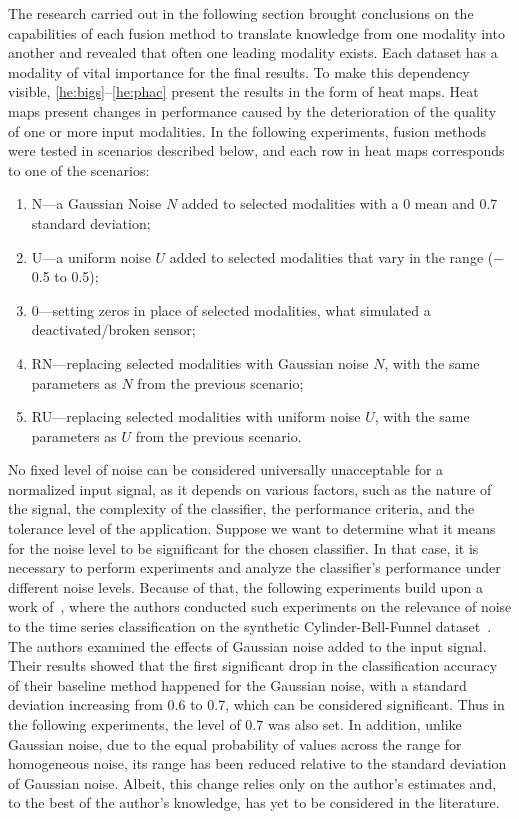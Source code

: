 \documentclass[a4paper, 10pt, twoside]{report}
\begin{document}
The research carried out in the following section brought conclusions on the capabilities of each fusion method to translate knowledge from one modality into another and revealed that often one leading modality exists. Each dataset has a modality of vital importance for the final results. To make this dependency visible, \Figure\ref{he:bigs}--\ref{he:phac} present the results in the form of heat maps. Heat maps present changes in performance caused by the deterioration of the quality of one or more input modalities. In the following experiments, fusion methods were tested in scenarios described below, and each row in heat maps corresponds to one of the scenarios:

\begin{enumerate}
    \item N---a Gaussian Noise $N$ added to selected modalities with a 0 mean and 0.7 standard deviation;
    \item U---a uniform noise $U$ added to selected modalities that vary in the range ($-$0.5 to 0.5);
    \item 0---setting zeros in place of selected modalities, what simulated a deactivated/broken sensor; 
    \item RN---replacing selected modalities with Gaussian noise $N$, with the same parameters as $N$ from the previous scenario;
    \item RU---replacing selected modalities with uniform noise $U$, with the same parameters as $U$ from the previous scenario.
\end{enumerate}

No fixed level of noise can be considered universally unacceptable for a normalized input signal, as it depends on various factors, such as the nature of the signal, the complexity of the classifier, the performance criteria, and the tolerance level of the application. Suppose we want to determine what it means for the noise level to be significant for the chosen classifier. In that case, it is necessary to perform experiments and analyze the classifier's performance under different noise levels. Because of that, the following experiments build upon a work of~\cite{BOSS}, where the authors conducted such experiments on the relevance of noise to the time series classification on the synthetic Cylinder-Bell-Funnel dataset~\cite{saito1994local}. The authors examined the effects of Gaussian noise added to the input signal. Their results showed that the first significant drop in the classification accuracy of their baseline method happened for the Gaussian noise, with a standard deviation increasing from 0.6 to 0.7, which can be considered significant. Thus in the following experiments, the level of 0.7 was also set. In addition, unlike Gaussian noise, due to the equal probability of values across the range for homogeneous noise, its range has been reduced relative to the standard deviation of Gaussian noise. Albeit, this change relies only on the author's estimates and, to the best of the author's knowledge, has yet to be considered in the literature.
\end{document}
